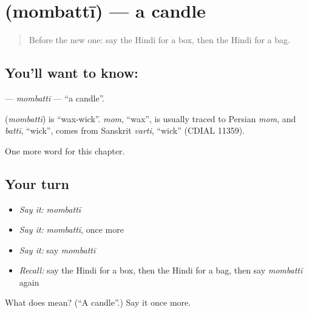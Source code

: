 \section[\texorpdfstring{\hi{मोमबत्ती} (mombattī)}{मोमबत्ती (mombattī)}]{ (mombattī) — a candle}

\label{lesson:HI-C131-mombatti}



\begin{quote}
Before the new one: say the Hindi for a box, then the Hindi for a bag.
\end{quote}

\subsection*{You'll want to know: }
\textbf{} — \emph{mombattī} — \textquotedblleft{}a candle\textquotedblright{}.

\begin{cousinweb}
\textbf{} (\emph{mombattī}) is \textquotedblleft{}wax-wick\textquotedblright{}. \emph{mom}, \textquotedblleft{}wax\textquotedblright{}, is usually traced to Persian \emph{mom}, and \emph{battī}, \textquotedblleft{}wick\textquotedblright{}, comes from Sanskrit \emph{varti}, \textquotedblleft{}wick\textquotedblright{} (CDIAL 11359).
\end{cousinweb}

\begin{grammarlens}[title={What you've built}]
One more word for this chapter.
\end{grammarlens}

\subsection*{Your turn}
\begin{itemize}
\raggedright
  \item \emph{Say it:} \emph{mombattī}
  \item \emph{Say it:} \emph{mombattī}, once more
  \item \emph{Say it:} say \emph{mombattī}
  \item \emph{Recall:} say the Hindi for a box, then the Hindi for a bag, then say \emph{mombattī} again
\end{itemize}

\begin{tcolorbox}[breakable,colback=teal!4,colframe=teal!35!black,title={Before you move on}]
What does  mean? (\textquotedblleft{}A candle\textquotedblright{}.) Say it once more.
\end{tcolorbox}
